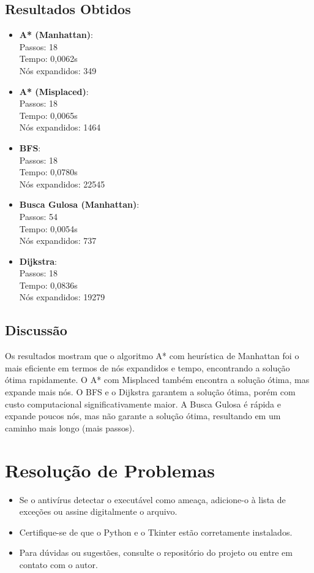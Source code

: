 \documentclass[12pt]{article}
\begin{document}
\subsection{Resultados Obtidos}
\begin{itemize}
  \item \textbf{A* (Manhattan)}: \\ 
  Passos: 18 \\ 
  Tempo: 0,0062s \\ 
  Nós expandidos: 349
  \item \textbf{A* (Misplaced)}: \\ 
  Passos: 18 \\ 
  Tempo: 0,0065s \\ 
  Nós expandidos: 1464
  \item \textbf{BFS}: \\ 
  Passos: 18 \\ 
  Tempo: 0,0780s \\ 
  Nós expandidos: 22545
  \item \textbf{Busca Gulosa (Manhattan)}: \\ 
  Passos: 54 \\ 
  Tempo: 0,0054s \\ 
  Nós expandidos: 737
  \item \textbf{Dijkstra}: \\ 
  Passos: 18 \\ 
  Tempo: 0,0836s \\ 
  Nós expandidos: 19279
\end{itemize}

\subsection{Discussão}
Os resultados mostram que o algoritmo A* com heurística de Manhattan foi o mais eficiente em termos de nós expandidos e tempo, encontrando a solução ótima rapidamente. O A* com Misplaced também encontra a solução ótima, mas expande mais nós. O BFS e o Dijkstra garantem a solução ótima, porém com custo computacional significativamente maior. A Busca Gulosa é rápida e expande poucos nós, mas não garante a solução ótima, resultando em um caminho mais longo (mais passos).

\section{Resolução de Problemas}
\begin{itemize}
  \item Se o antivírus detectar o executável como ameaça, adicione-o à lista de exceções ou assine digitalmente o arquivo.
  \item Certifique-se de que o Python e o Tkinter estão corretamente instalados.
  \item Para dúvidas ou sugestões, consulte o repositório do projeto ou entre em contato com o autor.
\end{itemize}
\end{document}
